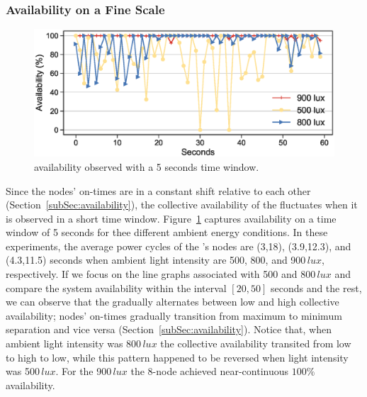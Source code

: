 \subsubsection{Availability on a Fine Scale}
%
\begin{figure}[t]
    \centering
     \includegraphics[width=\columnwidth]{figures/sysAvailabilityTimeline_470_sleep_5seconds_2}
    \caption{\cis availability observed with a 5 seconds time window.}
    \label{fig:fineScaleAvailability}
\end{figure}
Since the nodes' on-times are in a constant shift relative to each other (Section~\ref{subSec:availability}), the collective availability of the \cis fluctuates when it is observed in a short time window. 
Figure~\ref{fig:fineScaleAvailability} captures \cis availability on a time window of 5 seconds for thee different ambient energy conditions. In these experiments, the average power cycles of the \cis's nodes are (3,18), (3.9,12.3), and (4.3,11.5) seconds when ambient light intensity are 500, 800, and 900\,$\si{lux}$, respectively. 
If we focus on the line graphs associated with 500 and 800\,$\si{lux}$ and compare the system availability within the interval $[20,50]$ seconds and the rest, we can observe that the \cis gradually alternates between low and high collective availability; nodes' on-times gradually transition from maximum to minimum separation and vice versa (Section~\ref{subSec:availability}). Notice that, when ambient light intensity was 800\,$\si{lux}$ the \cis collective availability transited from low to high to low, while this pattern happened to be reversed when light intensity was  500\,$\si{lux}$. For the 900\,$\si{lux}$ the 8-node \cis achieved near-continuous $100\%$ availability. 
%
